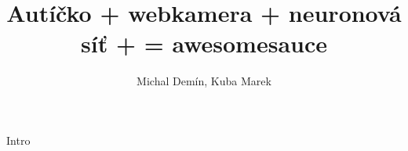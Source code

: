 \documentclass{beamer}
\title{Autíčko + webkamera + neuronová síť + = awesomesauce}
\author{Michal Demín, Kuba Marek}
\date{}
\begin{document}
\begin{frame}[plain]
\titlepage
\end{frame}



\begin{frame}{Intro}
\end{frame}
\end{document}
